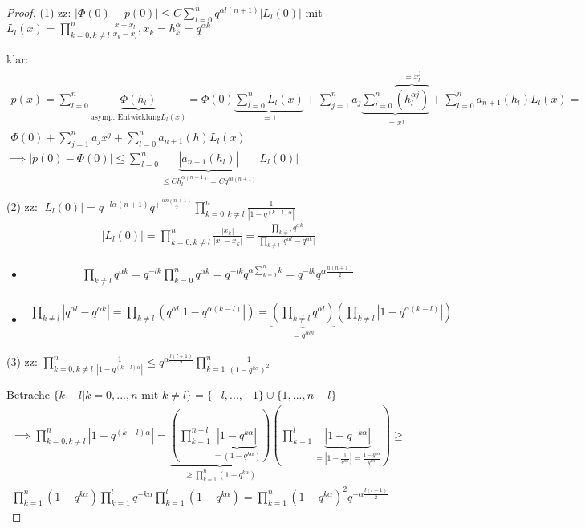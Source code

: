 \begin{proof}
	(1) zz: $|\Phi(0) - p(0)| \leq C \sum_{l=0}^{n} q^{\alpha l (n+1)} |L_l(0)|$ mit $L_l(x) = \prod_{k=0, k\neq l}^{n} \frac{x-x_l}{x_k - x_l}, x_k = h_k^\alpha = q^{\alpha k}$
	
	klar:
	\begin{align*}
		p(x) = \sum_{l=0}^{n} \underbrace{\Phi(h_l)}_{\text{asymp. Entwicklung} L_l(x)} = \Phi(0) \underbrace{\sum_{l=0}^{n} L_l(x)}_{=1} + \sum_{j=1}^{n} a_j \underbrace{\sum_{l=0}^{n} \overbrace{(h_l^{\alpha j})}^{=x_l^j}}_{=x^j} + \sum_{l=0}^{n} a_{n+1}(h_l) L_l(x) =\\
		\Phi(0) + \sum_{j=1}^{n} a_j x^j + \sum_{l=0}^{n} a_{n+1}(h) L_l(x)
	\end{align*}
	$\implies |p(0) - \Phi(0)| \leq \sum_{l=0}^{n} \underbrace{|a_{n+1}(h_l)|}_{\leq C h_l^{\alpha (n+1)} = C q^{\alpha l (n+1)}} |L_l(0)|$
	
	(2) zz: $|L_l(0)| = q^{-l\alpha (n+1)} q^{+\frac{\alpha n(n+1)}{2}} \prod_{k=0, k\neq l}^n \frac{1}{|1-q^{(k-l)\alpha}|}$
	\begin{align*}
		|L_l(0)| = \prod_{k=0, k\neq l}^{n} \frac{|x_k|}{|x_l - x_k|} = \frac{\prod_{k\neq l} q^{\alpha k}}{\prod_{k\neq l} |q^{\alpha l} - q^{\alpha k}|}
	\end{align*}
	\begin{itemize}
		\item \begin{align*}
			\prod_{k\neq l} q^{\alpha k} = q^{-lk} \prod_{k=0}^{n} q^{\alpha k} = q^{-lk} q^{\alpha \sum_{k=0}^{n} k} = q^{-lk} q^{\alpha \frac{n(n+1)}{2}}
		\end{align*}
		\item \begin{align*}
			\prod_{k\neq l} |q^{\alpha l} - q^{\alpha k}| = \prod_{k\neq l} ( q^{\alpha l} |1- q^{\alpha (k-l)}|) = \underbrace{\left(\prod_{k\neq l} q^{\alpha l}\right)}_{= q^{\alpha l n}} \left(\prod_{k\neq l} |1- q^{\alpha(k-l)}|\right)
		\end{align*}
	\end{itemize}
	
	(3) zz: $\prod_{k=0, k\neq l}^n \frac{1}{|1 - q^{(k-l)\alpha}|} \leq q^{\alpha \frac{l(l+1)}{2}} \prod_{k=1}^{n} \frac{1}{(1-q^{k\alpha})^2}$
	
	Betrache $\{k-l | k=0, ..., n \text{ mit } k\neq l\} = \{-l, ..., -1\} \cup \{1, ..., n-l\}$
	\begin{align*}
		\implies \prod_{k=0, k\neq l}^{n} |1-q^{(k-l)\alpha}| = \underbrace{\left(\prod_{k=1}^{n-l} \underbrace{|1-q^{k\alpha}|}_{=(1-q^{k\alpha})}\right)}_{\geq \prod_{k=1}^{n} (1-q^{k\alpha})} \left(\prod_{k=1}^{l} \underbrace{|1-q^{-k\alpha}|}_{=|1-\frac{1}{q^{k\alpha}}| = \frac{1-q^{k\alpha}}{q^{k\alpha}}}\right) \geq\\
		\prod_{k=1}^{n} (1-q^{k\alpha}) \prod_{k=1}^{l} q^{-k\alpha} \prod_{k=1}^{l} (1-q^{k\alpha}) = \prod_{k=1}^{n} (1-q^{k\alpha})^2 q^{-\alpha \frac{l(l+1)}{2}}
	\end{align*}
	

\end{proof}
